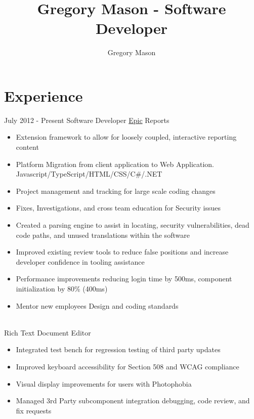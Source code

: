 \documentclass[letterpaper]{twentysecondcv} %
\author{Gregory Mason}
\title{Gregory Mason - Software Developer}
\begin{document}
\makeprofile %


\section{Experience}

\begin{twenty} %
\twentyitem
    	{July 2012 -}
		{Present}
        {Software Developer}
        {\href{https://www.epic.com/}{Epic}}
        { Reports}
        {\begin{itemize}
   	\item Extension framework to allow for loosely coupled, interactive reporting content
	\item Platform Migration from client application to Web Application. Javascript/TypeScript/HTML/CSS/C\#/.NET
	\item Project management and tracking for large scale coding changes
	\item Fixes, Investigations, and cross team education for Security issues
	\item Created a parsing engine to assist in locating, security vulnerabilities, dead code paths, and unused translations within the software
	\item Improved existing review tools to reduce false positions and increase developer confidence in tooling assistance
	\item Performance improvements reducing login time by 500ms, component initialization by 80\% (400ms) 
   	\item Mentor new employees Design and coding standards
        \end{itemize}}
\twentyitem
{}
{}
{ \\ \textnormal{Rich Text Document Editor}}
{}
{}
{\begin{itemize}
\item Integrated test bench for regression testing of third party updates
\item Improved keyboard accessibility for Section 508 and WCAG compliance
\item Visual display improvements for users with Photophobia
\item Managed 3rd Party subcomponent integration debugging, code review, and fix requests


\end{itemize}}
\end{twenty}
\end{document}
